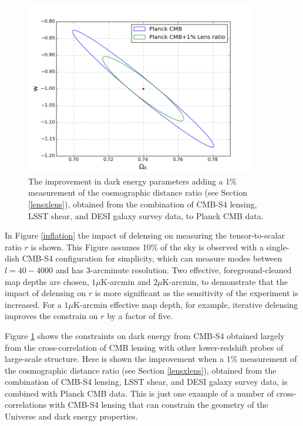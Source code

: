\documentclass{tcibook}
\begin{document}
\begin{figure}[h]
\centering
\includegraphics[width=0.9\textwidth]{Das_confEllipse_omL_w_1sigma.png}
\caption{The improvement in dark energy parameters adding a 1\% measurement of the cosmographic distance ratio (see Section \ref{lensxlens}), obtained from the combination of CMB-S4 lensing, LSST shear, and DESI galaxy survey data, to Planck CMB data.}
\label{darkEnergy}
\end{figure}

In Figure \ref{inflation} the impact of delensing on measuring the tensor-to-scalar ratio $r$ is shown.  This Figure assumes 10\% of the sky is observed with a single-dish CMB-S4 configuration for simplicity, which can measure modes between $l=40-4000$ and has 3-arcminute resolution.  Two effective, foreground-cleaned map depths are chosen, $1 \mu $K-arcmin and $2 \mu $K-arcmin, to demonstrate that the impact of delensing on $r$ is more significant as the sensitivity of the experiment is increased.  For a $1 \mu $K-arcmin effective map depth, for example, iterative delensing improves the constrain on $r$ by a factor of five.

Figure \ref{darkEnergy} shows the constraints on dark energy from CMB-S4 obtained largely from the cross-correlation of CMB lensing with other lower-redshift probes of large-scale structure.  Here is shown the improvement when a 1\% measurement of the cosmographic distance ratio (see Section \ref{lensxlens}), obtained from the combination of CMB-S4 lensing, LSST shear, and DESI galaxy survey data, is combined with Planck CMB data.  This is just one example of a number of cross-correlations with CMB-S4 lensing that can constrain the geometry of the Universe and dark energy properties.




%


\end{document}
